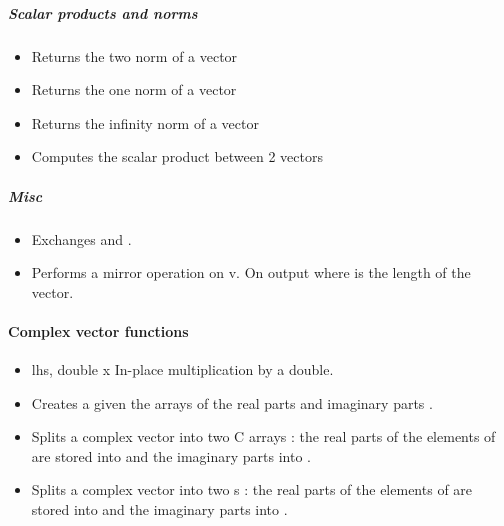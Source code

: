 \subparagraph{Scalar products and norms}
\begin{itemize}
\item {}
  \sshortdescribe Returns the two norm of a vector  

\item {}
  \sshortdescribe Returns the one norm of a vector  

\item {}
  \sshortdescribe Returns the infinity norm of a vector  

\item {} 
  \sshortdescribe Computes the scalar product between 2 vectors  
\end{itemize}

\subparagraph{Misc}

\begin{itemize}
\item {}
  \sshortdescribe Exchanges  and .
\item {}
  \sshortdescribe Performs a mirror operation on v. On output  where  is the length of the vector.
\end{itemize}


\paragraph{Complex vector functions}

\begin{itemize}
\item {}
  { \ptr lhs, double x}
  \sshortdescribe In-place multiplication by a double.

\item {}
  \sshortdescribe Creates a  given the arrays of the
  real parts  and imaginary parts .
\item {}
    \sshortdescribe Splits a complex vector into two C arrays : the
    real parts of the elements of  are stored into  and the
    imaginary parts into .
\item {}
  \sshortdescribe Splits a complex vector into two s : the
  real parts of the elements of  are stored into  and the
imaginary parts into .
\end{itemize}

